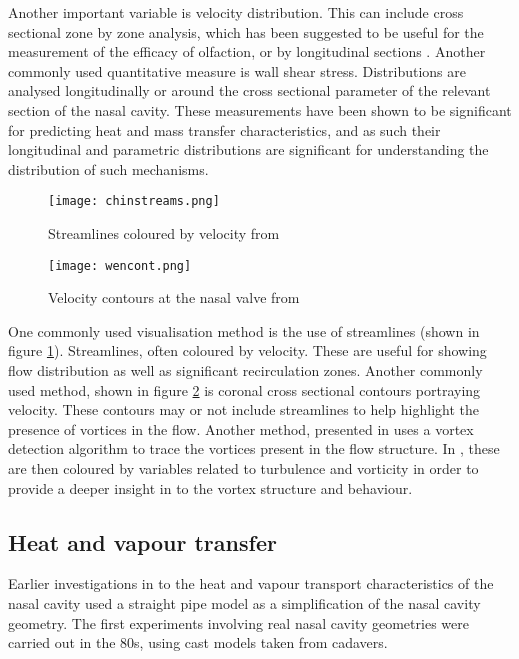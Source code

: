 Another important variable is velocity distribution\cite{Keyhani1995, Zhu2011, Lintermann2013}. This can include cross sectional zone by zone analysis\cite{Keyhani1995, Zhu2011}, which has been suggested to be useful for the measurement of the efficacy of olfaction\cite{Zhu2011}, or by longitudinal sections\cite{Lintermann2013,Taylor2010} . Another commonly used quantitative measure is wall shear stress. Distributions are analysed longitudinally\cite{Wen2008} or around the cross sectional parameter of the relevant section of the nasal cavity\cite{Burgos2014}. These measurements have been shown to be significant for predicting heat and mass transfer characteristics\cite{Taylor2010}, and as such their longitudinal and parametric distributions are significant for understanding the distribution of such mechanisms.


\begin{figure}
  \centering
  \texttt{[image: chinstreams.png]}
  \caption{Streamlines coloured by velocity from \cite{Tan2012}} \label{fig:chinstreams}
\centering
\end{figure}

\begin{figure}
  \centering
  \texttt{[image: wencont.png]}
  \caption{Velocity contours at the nasal valve from \cite{Wen2008}} \label{fig:wencont}
\centering
\end{figure}

One commonly used visualisation method is the use of streamlines (shown in figure \ref{fig:chinstreams}). Streamlines, often coloured by velocity\cite{Wen2008, Zhu2011, Garcia2007}. These are useful for showing flow distribution as well as significant recirculation zones\cite{Lintermann2013, Xi2014}. Another commonly used method, shown in figure \ref{fig:wencont} is coronal cross sectional contours portraying velocity. These contours may or not include streamlines to help highlight the presence of vortices in the flow\cite{Wen2008}. Another method, presented in \cite{Lintermann2013} uses a vortex detection algorithm to trace the vortices present in the flow structure. In \cite{Lintermann2013}, these are then coloured by variables related to turbulence and vorticity in order to provide a deeper insight in to the vortex structure and behaviour.
\subsection{Heat and vapour transfer}

Earlier investigations in to the heat and vapour transport characteristics of the nasal cavity used a straight pipe model as a simplification of the nasal cavity geometry\cite{Ingelstedt1961}. The first experiments involving real nasal cavity geometries were carried out in the 80s, using cast models taken from cadavers\cite{Nuckols1983}.

